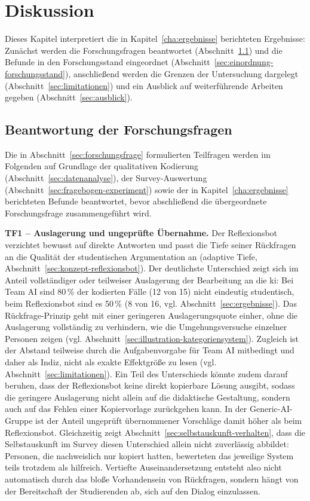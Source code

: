 \chapter{Diskussion}
\label{cha: diskussion}

Dieses Kapitel interpretiert die in Kapitel~\ref{cha:ergebnisse} berichteten Ergebnisse: Zunächst
werden die Forschungsfragen beantwortet (Abschnitt~\ref{sec:beantwortung-forschungsfragen}) und die
Befunde in den Forschungsstand eingeordnet (Abschnitt~\ref{sec:einordnung-forschungsstand}),
anschließend werden die Grenzen der Untersuchung dargelegt (Abschnitt~\ref{sec:limitationen}) und ein
Ausblick auf weiterführende Arbeiten gegeben (Abschnitt~\ref{sec:ausblick}).

\section{Beantwortung der Forschungsfragen}
\label{sec:beantwortung-forschungsfragen}

Die in Abschnitt~\ref{sec:forschungsfrage} formulierten Teilfragen werden im Folgenden auf Grundlage
der qualitativen Kodierung (Abschnitt~\ref{sec:datenanalyse}), der Survey-Auswertung
(Abschnitt~\ref{sec:fragebogen-experiment}) sowie der in Kapitel~\ref{cha:ergebnisse} berichteten
Befunde beantwortet, bevor abschließend die übergeordnete Forschungsfrage zusammengeführt wird.

\textbf{TF1 -- Auslagerung und ungeprüfte Übernahme.} Der Reflexionsbot verzichtet bewusst auf
direkte Antworten und passt die Tiefe seiner Rückfragen an die Qualität der studentischen
Argumentation an (adaptive Tiefe, Abschnitt~\ref{sec:konzept-reflexionsbot}). Der deutlichste
Unterschied zeigt sich im Anteil vollständiger oder teilweiser Auslagerung der Bearbeitung an die
\acrshort{ki}: Bei Team AI sind 80\,\% der kodierten Fälle (12 von 15) nicht eindeutig studentisch,
beim Reflexionsbot sind es 50\,\% (8 von 16, vgl. Abschnitt~\ref{sec:ergebnisse}). Das
Rückfrage-Prinzip geht mit einer geringeren Auslagerungsquote einher, ohne die Auslagerung vollständig
zu verhindern, wie die Umgehungsversuche einzelner Personen zeigen (vgl. Abschnitt~\ref{sec:illustration-kategoriensystem}).
Zugleich ist der Abstand teilweise durch die Aufgabenvorgabe für Team AI mitbedingt und daher als
Indiz, nicht als exakte Effektgröße zu lesen (vgl. Abschnitt~\ref{sec:limitationen}). Ein Teil des
Unterschieds könnte zudem darauf beruhen, dass der Reflexionsbot keine direkt kopierbare Lösung
ausgibt, sodass die geringere Auslagerung nicht allein auf die didaktische Gestaltung, sondern auch
auf das Fehlen einer Kopiervorlage zurückgehen kann. In der
Generic-AI-Gruppe ist der Anteil ungeprüft übernommener Vorschläge damit höher als beim Reflexionsbot.
Gleichzeitig zeigt Abschnitt~\ref{sec:selbstauskunft-verhalten}, dass die Selbstauskunft im Survey
diesen Unterschied allein nicht zuverlässig abbildet: Personen, die nachweislich nur kopiert hatten,
bewerteten das jeweilige System teils trotzdem als hilfreich. Vertiefte Auseinandersetzung entsteht
also nicht automatisch durch das bloße Vorhandensein von Rückfragen, sondern hängt von der
Bereitschaft der Studierenden ab, sich auf den Dialog einzulassen.

